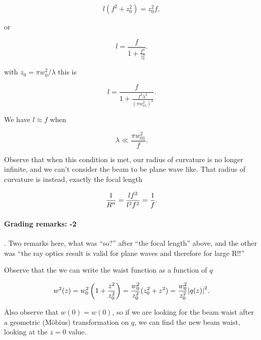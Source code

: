 {\begin{dmath}\label{eqn:problemSet4Problem1:420}
l ( f^2 + z_0^2 ) = z_0^2 f,
\end{dmath}

or

\begin{dmath}\label{eqn:problemSet4Problem1:440}
l
= \frac{f}{1 + \frac{f^2}{z_0^2} }.
\end{dmath}

with $z_0 = \pi w_0^2/\lambda$ this is

\begin{dmath}\label{eqn:problemSet4Problem1:460}
\boxed{
l
= \frac{f}{1 + \frac{f^2 \lambda^2}{\left(\pi w_{01}^2\right)^2} }.
}
\end{dmath}

We have $l \approx f$ when

\begin{dmath}\label{eqn:problemSet4Problem1:480}
\boxed{
\lambda \ll \frac{\pi w_{01}^2}{f}.
}
\end{dmath}

Observe that when this condition is met, our radius of curvature is no longer infinite, and we can't consider the beam to be plane wave like.  That radius of curvature is instead, exactly the focal length

\begin{dmath}\label{eqn:problemSet4Problem1:500}
\inv{R''} = \frac{l f^2}{ l^2 f^2} = \inv{f}.
\end{dmath}

\paragraph{Grading remarks: -2}.  Two remarks here, what was ``so?'' after ``the focal length'' above, and the other was ``the ray optics result is valid for plane waves and therefore for large R!!''


Observe that the we can write the waist function as a function of $q$

\begin{dmath}\label{eqn:problemSet4Problem1:20}
w^2(z)
= w_0^2 \left( 1 + \frac{z^2}{z_0^2} \right)
= \frac{w_0^2}{z_0^2} ( z_0^2 + z^2 )
= \frac{w_0^2}{z_0^2} \Abs{ q(z) }^2.
\end{dmath}

Also observe that $w(0) = w(0)$, so if we are looking for the beam waist after a geometric (M\"obius) transformation on $q$, we can find the new beam waist, looking at the $z = 0$ value.

}

